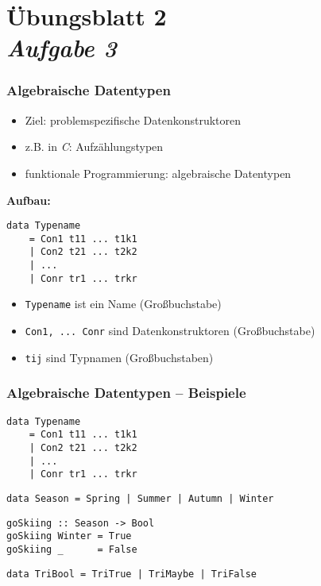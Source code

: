 \documentclass{beamer}
\begin{document}

\section{Übungsblatt 2 \\ \textit{\normalsize Aufgabe 3}}

\begin{frame}[fragile] \frametitle{Algebraische Datentypen}
	\begin{itemize}
		\item Ziel: problemspezifische Datenkonstruktoren
		\item z.B. in \textit{C}: Aufzählungstypen
		\item funktionale Programmierung: algebraische Datentypen
	\end{itemize}

	\textbf{Aufbau:}
	\begin{lstlisting}
data Typename 
	= Con1 t11 ... t1k1
	| Con2 t21 ... t2k2
	| ...
	| Conr tr1 ... trkr
	\end{lstlisting}
	\begin{itemize}
		\item \texttt{Typename} ist ein Name (Großbuchstabe)
		\item \texttt{Con1, ... Conr} sind Datenkonstruktoren (Großbuchstabe)
		\item \texttt{tij} sind Typnamen (Großbuchstaben)
	\end{itemize}
\end{frame}

\begin{frame}[fragile] \frametitle{Algebraische Datentypen -- Beispiele}
	
	\begin{lstlisting}
data Typename 
	= Con1 t11 ... t1k1
	| Con2 t21 ... t2k2
	| ...
	| Conr tr1 ... trkr
	\end{lstlisting}
	
	\begin{lstlisting}
data Season = Spring | Summer | Autumn | Winter
	\end{lstlisting}
	
	\begin{lstlisting}
goSkiing :: Season -> Bool
goSkiing Winter = True
goSkiing _      = False
	\end{lstlisting}
	
	\begin{lstlisting}
data TriBool = TriTrue | TriMaybe | TriFalse
	\end{lstlisting}
\end{frame}
\end{document}
